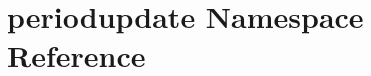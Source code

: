 \hypertarget{namespaceperiodupdate}{\section{periodupdate Namespace Reference}
\label{namespaceperiodupdate}
}
